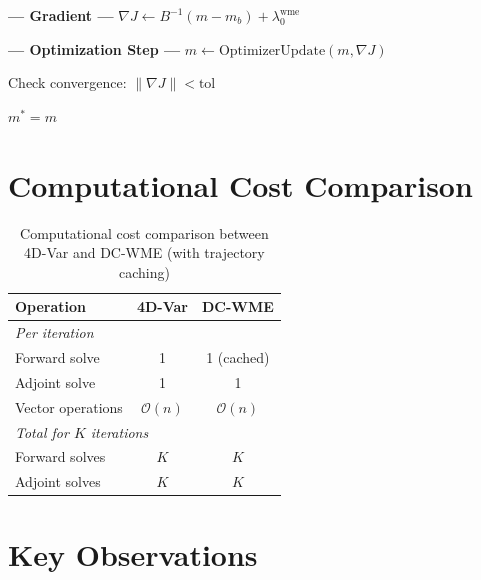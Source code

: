 \documentclass[11pt]{article}
\newcommand{\mb}{m_b}
\newcommand{\Binv}{B^{-1}}
\begin{document}
\begin{algorithm}[H]
\begin{algorithmic}[1]
    \State \textbf{--- Gradient ---} 
    \State $\nabla J \gets \Binv(m - \mb) + \lambda_0^{\text{wme}}$

    \State \textbf{--- Optimization Step ---} 
    \State $m \gets \text{OptimizerUpdate}(m, \nabla J)$

    \State Check convergence: $\|\nabla J\| < \text{tol}$

\EndWhile

\State \Return $m^* = m$

\end{algorithmic}
\end{algorithm}

\newpage
\section{Computational Cost Comparison}

\begin{table}[h]
\centering
\begin{tabular}{|l|c|c|}
\hline
\textbf{Operation} & \textbf{4D-Var} & \textbf{DC-WME} \\
\hline
\hline
\multicolumn{3}{|l|}{\textit{Per iteration}} \\
\hline
Forward solve & 1 & 1 (cached) \\
Adjoint solve & 1 & 1 \\
Vector operations & $\mathcal{O}(n)$ & $\mathcal{O}(n)$ \\
\hline
\hline
\multicolumn{3}{|l|}{\textit{Total for $K$ iterations}} \\
\hline
Forward solves & $K$ & $K$ \\
Adjoint solves & $K$ & $K$ \\
\hline
\end{tabular}
\caption{Computational cost comparison between 4D-Var and DC-WME (with trajectory caching)}
\end{table}

\section{Key Observations}
\end{document}
